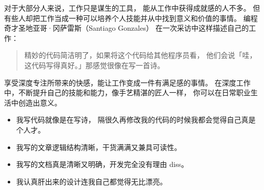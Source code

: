 \documentclass[../main.tex]{subfiles}
\begin{document}
\begin{cuenotes}
{    对于大部分人来说，工作只是谋生的工具，
    能从工作中获得成就感的人不多。
    但有些人却把工作当成一种可以培养个人技能并从中找到意义和价值的事情。
    编程奇才圣地亚哥·冈萨雷斯（Santiago Gonzales）
    在一次采访中这样描述自己的工作：
    \begin{quotation}
      精妙的代码简洁明了，如果将这个代码给其他程序员看，
      他们会说「哇，这代码写得真好。」那感觉很像在写一首诗。
    \end{quotation}
    享受深度专注所带来的快感，能让工作变成一件有满足感的事情。
    在深度工作中，不断提升自己的技能和能力，像手艺精湛的匠人一样，
    你可以在日常职业生活中创造出意义。
    \begin{itemize}
      \item 我写代码就像是在写诗，
        隔很久再修改我的代码的时候我都会觉得自己真是个人才。
      \item 我写的文章逻辑结构清晰，干货满满又兼具可读性。
      \item 我写的文档真是清晰又明确，开发完全没有理由 diss。
      \item 我认真肝出来的设计连我自己都觉得无比漂亮。
    \end{itemize}
  }
\end{cuenotes}
%
\end{document}
